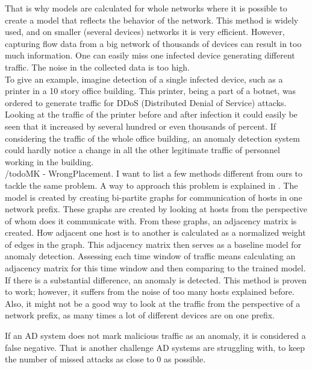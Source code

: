 \documentclass[thesis=B,english]{FITthesis}[2012/10/20]
\begin{document}
That is why models are calculated for whole networks where it is possible to create a model that reflects the behavior of the network.
This method is widely used, and on smaller (several devices) networks it is very efficient.
However, capturing flow data from a big network of thousands of devices can result in too much information.
One can easily miss one infected device generating different traffic.
The noise in the collected data is too high. \\

To give an example, imagine detection of a single infected device, such as a printer in a 10 story office building.
This printer, being a part of a botnet, was ordered to generate traffic for DDoS (Distributed Denial of Service) attacks.
Looking at the traffic of the printer before and after infection it could easily be seen that it increased by several hundred or even thousands of percent.
If considering the traffic of the whole office building, an anomaly detection system could hardly notice a change in all the other legitimate traffic of personnel working in the building. \\

/todo{MK - WrongPlacement. I want to list a few methods different from ours to tackle the same problem.}
A way to approach this problem is explained in \cite{xu2011network}.
The model is created by creating bi-partite graphs for communication of hosts in one network prefix.
These graphs are created by looking at hosts from the perspective of whom does it communicate with.
From these graphs, an adjacency matrix is created.
How adjacent one host is to another is calculated as a normalized weight of edges in the graph.
This adjacency matrix then serves as a baseline model for anomaly detection.
Assessing each time window of traffic means calculating an adjacency matrix for this time window and then comparing to the trained model.
If there is a substantial difference, an anomaly is detected.
This method is proven to work; however, it suffers from the noise of too many hosts explained before.
Also, it might not be a good way to look at the traffic from the perspective of a network prefix, as many times a lot of different devices are on one prefix. \\

If an AD system does not mark malicious traffic as an anomaly, it is considered a false negative.
That is another challenge AD systems are struggling with, to keep the number of missed attacks as close to 0 as possible. \\
\end{document}
